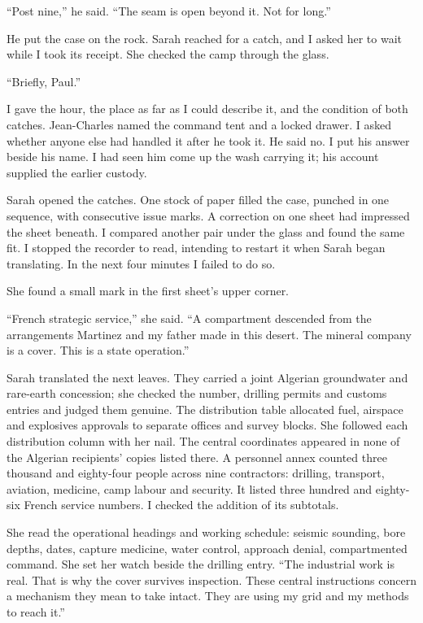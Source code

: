 ``Post nine,'' he said. ``The seam is open beyond it. Not for long.''\par

He put the case on the rock. Sarah reached for a catch, and I asked her to wait while I took its receipt. She checked the camp through the glass.\par

``Briefly, Paul.''\par

I gave the hour, the place as far as I could describe it, and the condition of both catches. Jean-Charles named the command tent and a locked drawer. I asked whether anyone else had handled it after he took it. He said no. I put his answer beside his name. I had seen him come up the wash carrying it; his account supplied the earlier custody.\par

Sarah opened the catches. One stock of paper filled the case, punched in one sequence, with consecutive issue marks. A correction on one sheet had impressed the sheet beneath. I compared another pair under the glass and found the same fit. I stopped the recorder to read, intending to restart it when Sarah began translating. In the next four minutes I failed to do so.\par

She found a small mark in the first sheet's upper corner.\par

``French strategic service,'' she said. ``A compartment descended from the arrangements Martinez and my father made in this desert. The mineral company is a cover. This is a state operation.''\par

Sarah translated the next leaves. They carried a joint Algerian groundwater and rare-earth concession; she checked the number, drilling permits and customs entries and judged them genuine. The distribution table allocated fuel, airspace and explosives approvals to separate offices and survey blocks. She followed each distribution column with her nail. The central coordinates appeared in none of the Algerian recipients' copies listed there. A personnel annex counted three thousand and eighty-four people across nine contractors: drilling, transport, aviation, medicine, camp labour and security. It listed three hundred and eighty-six French service numbers. I checked the addition of its subtotals.\par

She read the operational headings and working schedule: seismic sounding, bore depths, dates, capture medicine, water control, approach denial, compartmented command. She set her watch beside the drilling entry. ``The industrial work is real. That is why the cover survives inspection. These central instructions concern a mechanism they mean to take intact. They are using my grid and my methods to reach it.''\par

